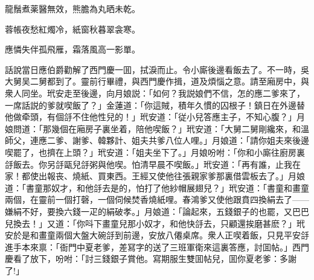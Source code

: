 龍鬚煮薬醫無效，熊膽為丸晒未乾。

蓉帳夜愁紅燭冷，紙窗秋暮翠衾寒。

應憐失伴孤飛雁，霜落風高一影單。

話說當日應伯爵勸解了西門慶一囬，拭淚而止。令小廝後邊看飯去了。不一時，吳大舅吴二舅都到了。靈前行畢禮，與西門慶作揖，道及煩惱之意。請至廂房中，與衆人同坐。玳安走至後邊，向月娘説：「如何？我説娘們不信，怎的應二爹來了，一席話説的爹就喫飯了？」金蓮道：「你這賊，積年久慣的囚根子！鎮日在外邊替他做牵頭，有個㧱不住他性兒的！」玳安道：「従小兒答應主子，不知心腹？」月娘問道：「那幾個在廂房子裏坐着，陪他喫飯？」玳安道：「大舅二舅剛纔來，和溫師父，連應二爹、謝爹、韓夥計、姐夫共爹八位人哩。」月娘道：「請你姐夫來後邊喫罷了，也擠在上頭？」玳安道：「姐夫坐下了。」月娘吩咐：「你和小廝往廚房裏㧱飯去。你另㧱甌兒㧱粥與他喫。怕清早晨不喫飯。」玳安道：「再有誰，止我在家！都使出報丧、燒紙、買東西。王經又使他往張親家爹那裏借雲板去了。」月娘道：「書童那奴才，和他㧱去是的，怕打了他紗帽展翅兒？」玳安道：「書童和畫童兩個，在靈前一個打磬，一個伺候焚香燒紙哩。春鴻爹又使他跟賁四換絹去了——嫌絹不好，要換六錢一疋的絹破孝。」月娘道：「論起來，五錢銀子的也罷，又巴巴兒換去！」又道：「你呌下畫童兒那小奴才，和他快㧱去，只顧還挨磨甚麽？」玳安於是和畫童兩個大盤大碗㧱到前邊，安放八僊桌席。衆人正喫着飯，只見平安㧱進手本來禀：「衙門中夏老爹，差冩字的送了三班軍衛來這裏答應，討囬帖。」西門慶看了放下，吩咐：「討三錢銀子賞他。寫期服生雙囬帖兒，囬你夏老爹：多謝了!」

